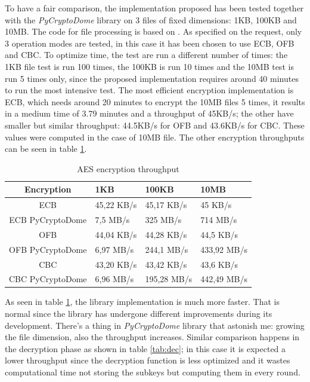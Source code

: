 \documentclass{article}
\begin{document}
To have a fair comparison, the implementation proposed has been tested together with the \textit{PyCryptoDome} library on 3 files of fixed dimensions: 1KB, 100KB and 10MB. The code for file processing is based on \cite{pycryptodome}. As specified on the request, only 3 operation modes are tested, in this case it has been chosen to use ECB, OFB and CBC. To optimize time, the test are run a different number of times: the 1KB file test is run 100 times, the 100KB is run 10 times and the 10MB test is run 5 times only, since the proposed implementation requires around 40 minutes to run the most intensive test.
\newline
The most efficient encryption implementation is ECB, which needs around 20 minutes to encrypt the 10MB files 5 times, it results in a medium time of 3.79 minutes and a throughput of 45KB/s; the other have smaller but similar throughput: 44.5KB/s for OFB and 43.6KB/s for CBC. These values were computed in the case of 10MB file. The other encryption throughputs can be seen in table \ref{tab:enc}.

\renewcommand{\arraystretch}{2}

\begin{table}[H]
\begin{center}
\begin{tabular}{ |c || m{2cm} | m{2cm} | m{2cm}|  }
\hline
  Encryption & 1KB & 100KB & 10MB \\ [0.5ex] 
 \hline\hline
   ECB & 45,22 KB/s & 45,17 KB/s & 45 KB/s \\ 
 \hline
  ECB PyCryptoDome & 7,5 MB/s & 325 MB/s & 714 MB/s \\ 
 \hline
 OFB & 44,04 KB/s & 44,28 KB/s &  44,5 KB/s \\
 \hline
  OFB PyCryptoDome & 6,97 MB/s & 244,1 MB/s &  433,92 MB/s \\
 \hline
 CBC & 43,20 KB/s & 43,42 KB/s &  43,6 KB/s \\ 
 \hline
  CBC PyCryptoDome & 6,96 MB/s & 195,28 MB/s &  442,49 MB/s \\
 \hline
\end{tabular}
\caption{AES encryption throughput}
\label{tab:enc}
\end{center}
\end{table}

As seen in table \ref{tab:enc}, the library implementation is much more faster. That is normal since the library has undergone different improvements during its development. There's a thing in \textit{PyCryptoDome} library that astonish me: growing the file dimension, also the throughput increases. Similar comparison happens in the decryption phase as shown in table \ref{tab:dec}; in this case it is expected a lower throughput since the decryption function is less optimized and it wastes computational time not storing the subkeys but computing them in every round.
\end{document}
